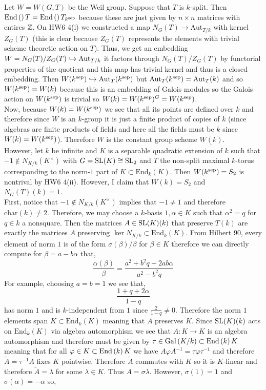 \documentclass[12pt]{article}
\begin{document}
Let $W = W(G,T)$ be the Weil group. Suppose that $T$ is $k$-split. Then $\mathrm{End}\left(  \right){T} = \mathrm{End}\left(  \right){T_{k^{\mathrm{sep}}}}$ because these are just given by $n \times n$ matrices with entires $\mathbb{Z}$. On HW6 4(i) we constructed a map $N_G(T) \to \mathrm{Aut}_{T/k}$ with kernel $Z_G(T)$ (this is clear because $Z_G(T)$ represents the elements with trivial scheme theoretic action on $T$). Thus, we get an embedding $W = N_G(T)/Z_G(T) \hookrightarrow \mathrm{Aut}_{T/k}$ it factors through $N_G(T)/Z_G(T)$ by functorial properties of the quotient and this map has trivial kernel and thus is a closed embedding. Then $W(k^{\mathrm{sep}}) \hookrightarrow \mathrm{Aut}_T(k^{\mathrm{sep}})$ but $\mathrm{Aut}_T(k^{\mathrm{sep}}) = \mathrm{Aut}_T(k)$ and so $W(k^{\mathrm{sep}}) = W(k)$ because this is an embedding of Galois modules so the Galois action on $W(k^{\mathrm{sep}})$ is trivial so $W(k) = W(k^{\mathrm{sep}})^G = W(k^{\mathrm{sep}})$.
\bigskip\\
Now, because $W(k) = W(k^{\mathrm{sep}})$ we see that all its points are defined over $k$ and therefore since $W$ is an \etale $k$-group it is just a finite product of copies of $k$ (since \etale algebras are finite products of fields and here all the fields must be $k$ since $W(k) = W(k^{\mathrm{sep}})$). Therefore $W$ is the constant group scheme $\underline{W(k)}$. 
\bigskip\\
However, let $k$ be infinite and $K$ is a separable quadratic extension of $k$ such that $-1 \notin N_{K/k}(K^\times)$ with $G = \mathrm{SL}(K) \cong \mathrm{SL}_2$ and $T$ the non-split maximal $k$-torus corresponding to the norm-$1$ part of $K \subset \mathrm{End}_k(K)$. Then $W(k^{\mathrm{sep}}) = S_2$ is nontrival by HW6 4(ii). However, I claim that $W(k) = S_2$ and $N_G(T)(k) = 1$.
\bigskip\\
First, notice that $-1 \notin N_{K/k}(K^\times)$ implies that $-1 \neq 1$ and therefore $\mathrm{char}(k) \neq 2$. Therefore, we may choose a $k$-basis $1, \alpha \in K$ such that $\alpha^2 = q$ for $q \in k$ a nonsquare. Then the matrices $A \in \mathrm{SL}(K)(k)$ that preserve $T(k)$ are exactly the matrices $A$ preserving $\ker{N_{K/k}} \subset \mathrm{End}_k(K)$. From Hilbert 90, every element of norm $1$ is of the form $\sigma(\beta)/\beta$ for $\beta \in K$ therefore we can directly compute for $\beta = a - b \alpha$ that,
\[ \frac{\alpha(\beta)}{\beta} = \frac{a^2 + b^2 q + 2 ab \alpha}{a^2 - b^2 q} \]
For example, choosing $a = b = 1$ we see that,
\[ \frac{1 + q + 2 \alpha}{1 - q} \]
has norm $1$ and is $k$-independent from $1$ since $\frac{2}{1-q} \neq 0$. Therefore the norm $1$ elements span $K \subset \mathrm{End}_k(K)$ meaning that $A$ preserves $K$. Since $\mathrm{SL}(K)(k)$ acts on $\mathrm{End}_k(K)$ via algebra automorphism we see that $A : K \to K$ is an algebra automorphism and therefore must be given by $\tau \in \mathrm{Gal}\left( K/k \right) \subset \mathrm{End}\left( k \right){K}$ meaning that for all $\varphi \in K \subset \mathrm{End}\left( k \right){K}$ we have $A \varphi A^{-1} = \tau \varphi \tau^{-1}$ and therefore $\tilde{A} = \tau^{-1} A$ fixes $K$ pointwise. Therefore $\tilde{A}$ commutes with $K$ so it is $K$-linear and therefore $\tilde{A} = \lambda$ for some $\lambda \in K$. Thus $A = \sigma \lambda$. However, $\sigma(1) = 1$ and $\sigma(\alpha) = -\alpha$ so,
\end{document}
